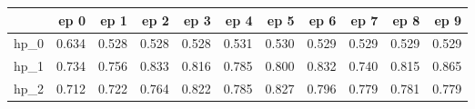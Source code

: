 \begin{tabular}{lrrrrrrrrrr}
\toprule
{} &   ep 0 &   ep 1 &   ep 2 &   ep 3 &   ep 4 &   ep 5 &   ep 6 &   ep 7 &   ep 8 &   ep 9 \\
\midrule
hp\_0 &  0.634 &  0.528 &  0.528 &  0.528 &  0.531 &  0.530 &  0.529 &  0.529 &  0.529 &  0.529 \\
hp\_1 &  0.734 &  0.756 &  0.833 &  0.816 &  0.785 &  0.800 &  0.832 &  0.740 &  0.815 &  0.865 \\
hp\_2 &  0.712 &  0.722 &  0.764 &  0.822 &  0.785 &  0.827 &  0.796 &  0.779 &  0.781 &  0.779 \\
\bottomrule
\end{tabular}
